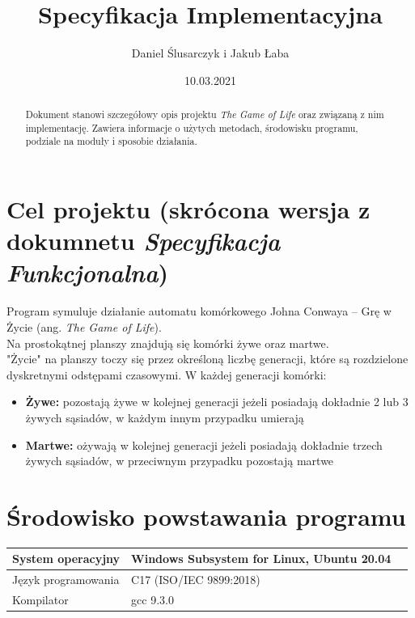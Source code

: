 \documentclass[11pt,a4paper]{report}
\title{\Huge Specyfikacja Implementacyjna}
\author{Daniel Ślusarczyk i Jakub Łaba}
\date{10.03.2021}
\begin{document}
\maketitle

\renewcommand*\thesection{\arabic{section}} 

\begin{abstract}
Dokument stanowi szczegółowy opis projektu \textsl {The Game of Life} oraz związaną z nim implementację. Zawiera informacje o użytych metodach, środowisku programu,
podziale na moduły i sposobie działania.
\end{abstract}

\pagestyle{fancy}
\fancyhf{}
\setcounter{page}{0}

{
\fancyhead{} 
\fancyfoot{} 
}
\thispagestyle{empty} 
\tableofcontents 
\thispagestyle{empty}
\newpage

{
\fancyhead{} 
\fancyfoot[C]{\thepage}
}

\section{Cel projektu (skrócona wersja z dokumnetu \textsl {Specyfikacja Funkcjonalna})}\label{sec:tekst}
Program symuluje działanie automatu komórkowego Johna Conwaya -- Grę w Życie (ang. \textsl {The Game of Life}).\\
Na prostokątnej planszy znajdują się komórki żywe oraz martwe.\\
"Życie" na planszy toczy się przez określoną liczbę generacji, które są rozdzielone dyskretnymi odstępami czasowymi.
W każdej generacji komórki:
\begin {itemize}
\item \textbf {Żywe:} pozostają żywe w kolejnej generacji jeżeli posiadają dokładnie 2 lub 3 żywych sąsiadów, w każdym innym przypadku umierają
\item \textbf {Martwe:} ożywają w kolejnej generacji jeżeli posiadają dokładnie trzech żywych sąsiadów, w przeciwnym przypadku pozostają martwe
\end {itemize}


\section{Środowisko powstawania programu}\label{sec:teskt}
\begin{tabularx}{\textwidth}{  X|Xl  }
\hline
			System operacyjny		&Windows Subsystem for Linux, Ubuntu 20.04\\
\hline
			Język programowania	&C17 (ISO/IEC 9899:2018)\\
\hline
			Kompilator			&gcc 9.3.0\\
\end{tabularx}
\end{document}
